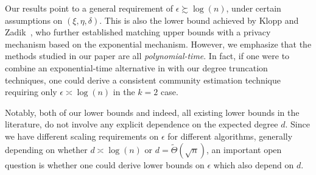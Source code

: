 \documentclass{article}
\newcommand{\mprob}{\mathbb{P}}
\begin{document}
Our results point to a general requirement of $\epsilon \succsim \log(n)$, under certain assumptions on $(\xi, \eta, \delta)$. This is also the lower bound achieved by Klopp and Zadik~\cite{klopp2026node}, who further established matching upper bounds with a privacy mechanism based on the exponential mechanism. However, we emphasize that the methods studied in our paper are all \emph{polynomial-time}. In fact, if one were to combine an exponential-time alternative in \cite{CheEtal23} with our degree truncation techniques, one could derive a consistent community estimation technique requiring only $\epsilon \asymp \log(n)$ in the $k=2$ case.

Notably, both of our lower bounds and indeed, all existing lower bounds in the literature, do not involve any explicit dependence on the expected degree $d$. Since we have different scaling requirements on $\epsilon$ for different algorithms, generally depending on whether $d \asymp \log(n)$ or $d = \widetilde{\Theta}(\sqrt{n})$, an important open question is whether one could derive lower bounds on $\epsilon$ which also depend on $d$.



\end{document}
